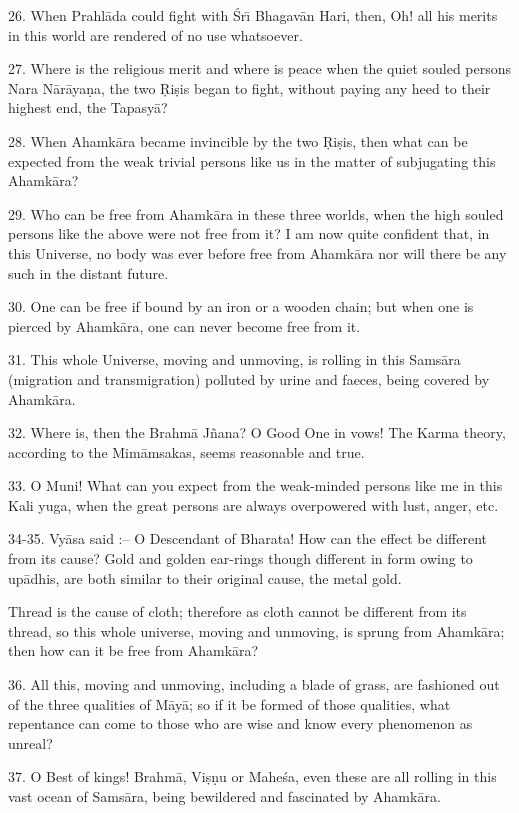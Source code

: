 26. When Prahl\=ada could fight with \'Sr\={\i} Bhagav\=an Hari, then, Oh! all his merits in this world are rendered of no use whatsoever.

27. Where is the religious merit and where is peace when the quiet souled persons Nara N\=ar\=aya\d{n}a, the two \d{R}i\d{s}is began to fight, without paying any heed to their highest end, the Tapasy\=a?

28. When Ahamk\=ara became invincible by the two \d{R}i\d{s}is, then what can be expected from the weak trivial persons like us in the matter of subjugating this Ahamk\=ara?

29. Who can be free from Ahamk\=ara in these three worlds, when the high souled persons like the above were not free from it? I am now quite confident that, in this Universe, no body was ever before free from Ahamk\=ara nor will there be any such in the distant future.

30. One can be free if bound by an iron or a wooden chain; but when one is pierced by Ahamk\=ara, one can never become free from it.

31. This whole Universe, moving and unmoving, is rolling in this Sams\=ara (migration and transmigration) polluted by urine and faeces, being covered by Ahamk\=ara.

32. Where is, then the Brahm\=a J\~nana? O Good One in vows! The Karma theory, according to the Mim\=amsakas, seems reasonable and true.

33. O Muni! What can you expect from the weak-minded persons like me in this Kali yuga, when the great persons are always overpowered with lust, anger, etc.

34-35. Vy\=asa said :-- O Descendant of Bharata! How can the effect be different from its cause? Gold and golden ear-rings though different in form owing to up\=adhis, are both similar to their original cause, the metal gold.

Thread is the cause of cloth; therefore as cloth cannot be different from its thread, so this whole universe, moving and unmoving, is sprung from Ahamk\=ara; then how can it be free from Ahamk\=ara?

36. All this, moving and unmoving, including a blade of grass, are fashioned out of the three qualities of M\=ay\=a; so if it be formed of those qualities, what repentance can come to those who are wise and know every phenomenon as unreal?

37. O Best of kings! Brahm\=a, Vi\d{s}\d{n}u or Mahe\'sa, even these are all rolling in this vast ocean of Sams\=ara, being bewildered and fascinated by Ahamk\=ara.

